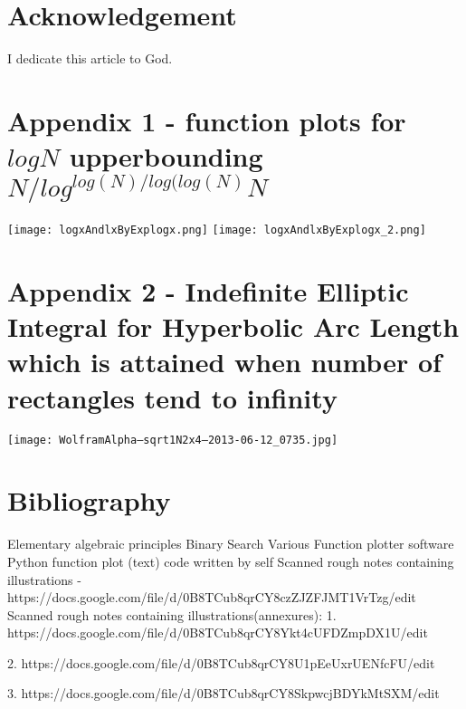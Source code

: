 \documentclass[11pt,onecolumn]{article}
\begin{document}
\section{Acknowledgement}
I dedicate this article to God.

\section{Appendix 1 - function plots for $logN$ upperbounding $N/log^{log(N)/log(log(N)}N$}
\texttt{[image: logxAndlxByExplogx.png]} 
\texttt{[image: logxAndlxByExplogx\_2.png]} 

\section{Appendix 2 - Indefinite Elliptic Integral for Hyperbolic Arc Length which is attained when number of rectangles tend to infinity}
\texttt{[image: WolframAlpha--sqrt1N2x4--2013-06-12\_0735.jpg]} 

\section{Bibliography}
\begin{thebibliography}{99}
 Elementary algebraic principles
 Binary Search
 Various Function plotter software 
 Python function plot (text) code written by self
 Scanned rough notes containing illustrations  - https://docs.google.com/file/d/0B8TCub8qrCY8czZJZFJMT1VrTzg/edit
 Scanned rough notes containing illustrations(annexures):
1. https://docs.google.com/file/d/0B8TCub8qrCY8Ykt4cUFDZmpDX1U/edit

2. https://docs.google.com/file/d/0B8TCub8qrCY8U1pEeUxrUENfcFU/edit

3. https://docs.google.com/file/d/0B8TCub8qrCY8SkpwcjBDYkMtSXM/edit

\end{thebibliography}
\end{document}
